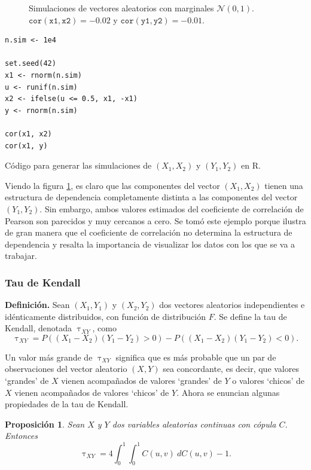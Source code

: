 \documentclass[11pt,a4paper]{article}
\newtheorem{proposition}{Proposición}[subsection]
\begin{document}
\begin{figure}[H]
    \caption{Simulaciones de vectores aleatorios con marginales $\mathcal{N}(0, 1)$. $\mathtt{cor(x1, x2)} = -0.02$ y $\mathtt{cor(y1, y2)} = -0.01$.}
    \label{fig:panel_corr}
\end{figure}

\begin{table}[htb]
\begin{lstlisting}
n.sim <- 1e4

set.seed(42)
x1 <- rnorm(n.sim)
u <- runif(n.sim)
x2 <- ifelse(u <= 0.5, x1, -x1)
y <- rnorm(n.sim)

cor(x1, x2)
cor(x1, y)
\end{lstlisting}
\caption{Código para generar las simulaciones de $(X_1, X_2)$ y $(Y_1, Y_2)$ en R.}
\label{cod:sim_ejemplo}
\end{table}

Viendo la figura \ref{fig:panel_corr}, es claro que las componentes del vector $(X_1, X_2)$ tienen una estructura de dependencia completamente distinta a las componentes del vector $(Y_1, Y_2)$. Sin embargo, ambos valores estimados del coeficiente de correlación de Pearson son parecidos y muy cercanos a cero. Se tomó este ejemplo porque ilustra de gran manera que el coeficiente de correlación no determina la estructura de dependencia y resalta la importancia de visualizar los datos con los que se va a trabajar.

\subsubsection*{Tau de Kendall}
\textbf{Definición.} Sean $(X_1, Y_1)$ y $(X_2, Y_2)$ dos vectores aleatorios independientes e idénticamente distribuidos, con función de distribución $F$. Se define la tau de Kendall, denotada $\uptau_{XY}$, como $$\uptau_{XY} = P\left((X_1-X_2)(Y_1-Y_2)>0\right) - P\left((X_1-X_2)(Y_1-Y_2)<0\right).$$

Un valor más grande de $\uptau_{XY}$ significa que es más probable que un par de observaciones del vector aleatorio $(X, Y)$ sea concordante, es decir, que valores `grandes' de $X$ vienen acompañados de valores `grandes' de $Y$ o valores `chicos' de $X$ vienen acompañados de valores `chicos' de $Y$. Ahora se enuncian algunas propiedades de la tau de Kendall.

\begin{proposition}
Sean $X$ y $Y$ dos variables aleatorias continuas con cópula $C$. Entonces
$$\uptau_{XY} = 4\int_{0}^1\int_{0}^1C(u, v) \ dC(u, v) - 1.$$ 
\end{proposition}
\end{document}
